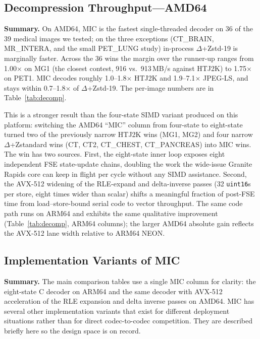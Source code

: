 \documentclass[journal]{IEEEtran}
\begin{document}
\subsection{Decompression Throughput---AMD64}
\label{subsec:decomp-amd}

\textbf{Summary.} On AMD64, MIC is the fastest single-threaded decoder
on 36 of the 39 medical images we tested; on the three exceptions
(CT\_BRAIN, MR\_INTERA, and the small PET\_LUNG study) in-process
$\Delta$+Zstd-19 is marginally faster. Across the 36 wins the margin
over the runner-up ranges from 1.00$\times$ on MG1 (the closest contest,
916 vs.\ 913\,MB/s against HTJ2K) to 1.75$\times$ on PET1. MIC decodes
roughly 1.0--1.8$\times$ HTJ2K and 1.9--7.1$\times$ JPEG-LS, and stays
within 0.7--1.8$\times$ of $\Delta$+Zstd-19. The per-image numbers are in
Table~\ref{tab:decomp}.

This is a stronger result than the four-state SIMD variant produced on
this platform: switching the AMD64 ``MIC'' column from four-state to
eight-state turned two of the previously narrow HTJ2K wins (MG1, MG2)
and four narrow $\Delta$+Zstandard wins (CT, CT2, CT\_CHEST,
CT\_PANCREAS) into MIC wins.
The win has two sources. First, the eight-state inner loop exposes
eight independent FSE state-update chains, doubling the work the
wide-issue Granite Rapids core can keep in flight per cycle without any
SIMD assistance. Second, the AVX-512 widening of the RLE-expand and
delta-inverse passes (32 \texttt{uint16}s per store, eight times wider
than scalar) shifts a meaningful fraction of post-FSE time from
load--store-bound serial code to vector throughput. The same code path
runs on ARM64 and exhibits the same qualitative improvement
(Table~\ref{tab:decomp}, ARM64 columns); the larger AMD64 absolute gain reflects
the AVX-512 lane width relative to ARM64 NEON.

\subsection{Implementation Variants of MIC}
\label{subsec:variants}

\textbf{Summary.} The main comparison tables use a single MIC column for
clarity: the eight-state C decoder on ARM64 and the same decoder with
AVX-512 acceleration of the RLE expansion and delta inverse passes on
AMD64. MIC has several other implementation variants that exist for
different deployment situations rather than for direct codec-to-codec
competition.
They are described briefly here so the design space is on record.
\end{document}
